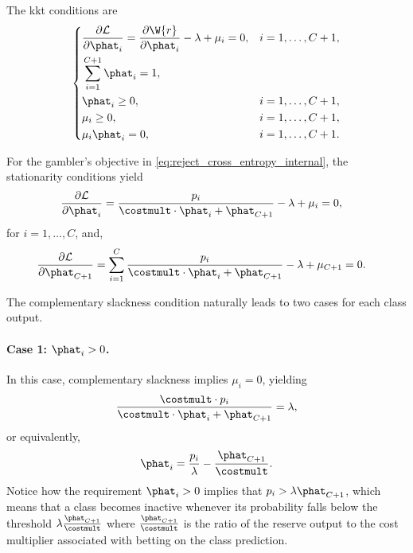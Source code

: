 The \gls*{kkt} conditions are
\begin{align*}
    \left\{
    \begin{aligned}
         & \frac{\partial \mathcal{L}}{\partial \phat_i}
        = \frac{\partial \W{r}}{\partial \phat_i}
        - \lambda + \mu_i = 0,
         &                                               & i=1,\ldots,C+1, \\
         & \sum_{i=1}^{C+1} \phat_i = 1,                                   \\
         & \phat_i                   \ge 0,
         &                                               & i=1,\ldots,C+1, \\
         & \mu_i                       \ge 0,
         &                                               & i=1,\ldots,C+1, \\
         & \mu_i \phat_i             = 0,
         &                                               & i=1,\ldots,C+1.
    \end{aligned}
    \right.
\end{align*}

For the gambler's objective in \cref{eq:reject_cross_entropy_internal}, the stationarity conditions yield
\begin{align*}
    \frac{\partial\mathcal{L}}{\partial\phat_i}
     & =
    \frac{p_i}
    {\costmult\cdot\phat_i+\phat_{C+1}}
    -\lambda+\mu_i
    =0,
\end{align*}
for \(i = 1, \ldots, C\), and,
\begin{align*}
    \frac{\partial\mathcal{L}}{\partial\phat_{C+1}}
     & =
    \sum_{i=1}^{C}
    \frac{p_i}
    {\costmult\cdot\phat_i+\phat_{C+1}}
    -\lambda+\mu_{C+1}
    =0.
\end{align*}

The complementary slackness condition naturally leads to two cases for each class output.

\paragraph{Case 1: $\phat_i>0$.}
In this case, complementary slackness implies $\mu_i=0$, yielding
\begin{align*}
    \frac{\costmult\cdot p_i}
    {\costmult\cdot\phat_i+\phat_{C+1}}
    =
    \lambda,
\end{align*}
or equivalently,
\begin{align*}
    \phat_i
    =
    \frac{p_i}{\lambda}-\frac{\phat_{C+1}}{\costmult}.
\end{align*}
Notice how the requirement $\phat_i>0$ implies that $p_i>\lambda\phat_{C+1}$, which means that a class becomes inactive whenever its probability falls below the threshold \(\lambda\frac{\phat_{C+1}}{\costmult}\) where \(\frac{\phat_{C+1}}{\costmult}\) is the ratio of the reserve output to the cost multiplier associated with betting on the class prediction.

